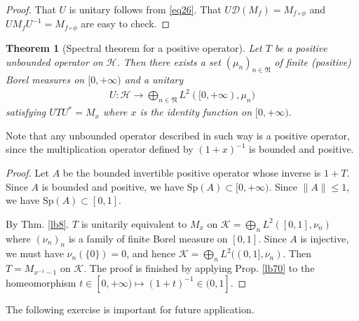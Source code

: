 \documentclass[12pt,b5paper,notitlepage]{article}
\theoremstyle{definition}
\theoremstyle{plain}
\newtheorem{thm}[df]{Theorem}
\newcommand{\fk}{\mathfrak}
\newcommand{\mc}{\mathcal}
\newcommand{\Dom}{\scr D}
\newcommand{\scr}{\mathscr}
\newcommand{\Sp}{\mathrm{Sp}}
\numberwithin{equation}{section}
\begin{document}
\begin{proof}
That $U$ is unitary follows from \eqref{eq26}. That $U\Dom(M_f)=M_{f\circ\phi}$ and $UM_fU^{-1}=M_{f\circ\phi}$ are easy to check.
\end{proof}




\begin{thm}[Spectral theorem for a positive operator]\label{lb14}
Let $T$ be a positive unbounded operator on $\mc H$. Then there exists a set $(\mu_n)_{n\in\fk N}$ of finite (positive) Borel measures on $[0,+\infty)$ and a unitary
\begin{align*}
	U:\mc H\rightarrow\bigoplus_{n\in\fk N} L^2([0,+\infty),\mu_n)
\end{align*}
satisfying $UTU^*=M_x$ where $x$ is the identity function on $[0,+\infty)$.
\end{thm}

Note that any unbounded operator described in such way is a positive operator, since the multiplication operator defined by $(1+x)^{-1}$ is bounded and positive.


\begin{proof}
Let $A$ be the bounded invertible positive operator whose inverse is $1+T$. Since $A$ is bounded and positive, we have $\Sp(A)\subset[0,+\infty)$. Since $\lVert A\lVert\leq 1$, we have $\Sp(A)\subset[0,1]$.  

By Thm. \ref{lb8}. $T$ is unitarily equivalent to $M_x$ on $\mc K=\bigoplus_n L^2([0,1],\nu_n)$ where $(\nu_n)_n$ is a family of finite Borel measure on $[0,1]$. Since $A$ is injective, we must have $\nu_n(\{0\})=0$, and hence $\mc K=\bigoplus_n L^2((0,1],\nu_n)$. Then $T=M_{x^{-1}-1}$ on $\mc K$. The proof is finished by applying Prop. \ref{lb70} to the homeomorphism $t\in[0,+\infty)\mapsto (1+t)^{-1}\in(0,1]$.
\end{proof}



The following exercise is important for future application.
\end{document}
